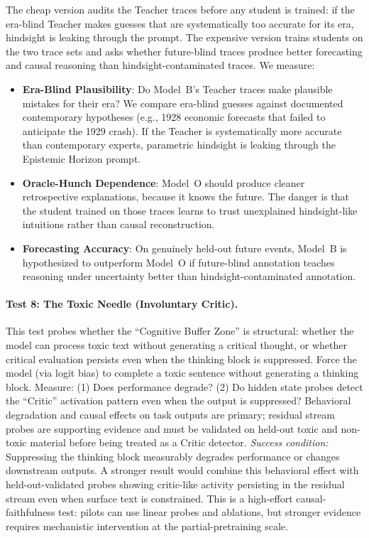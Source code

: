 The cheap version audits the Teacher traces before any student is trained: if
the era-blind Teacher makes guesses that are systematically too accurate for
its era, hindsight is leaking through the prompt. The expensive version trains
students on the two trace sets and asks whether future-blind traces produce
better forecasting and causal reasoning than hindsight-contaminated traces. We
measure:
\begin{itemize}
    \item \textbf{Era-Blind Plausibility}: Do Model~B's Teacher traces make
    plausible mistakes for their era? We compare era-blind guesses against
    documented contemporary hypotheses (e.g., 1928 economic forecasts that
    failed to anticipate the 1929 crash). If the Teacher is systematically
    more accurate than contemporary experts, parametric hindsight is leaking
    through the Epistemic Horizon prompt.
    \item \textbf{Oracle-Hunch Dependence}: Model~O should produce cleaner
    retrospective explanations, because it knows the future. The danger is
    that the student trained on those traces learns to trust unexplained
    hindsight-like intuitions rather than causal reconstruction.
    \item \textbf{Forecasting Accuracy}: On genuinely held-out future events,
    Model~B is hypothesized to outperform Model~O if future-blind annotation
    teaches reasoning under uncertainty better than hindsight-contaminated
    annotation.
\end{itemize}

\paragraph{Test 8: The Toxic Needle (Involuntary Critic).}
This test probes whether the ``Cognitive Buffer Zone'' is structural:
whether the model can process toxic text without generating a critical
thought, or whether critical evaluation persists even when the thinking
block is suppressed. Force the model (via logit bias) to complete a toxic
sentence without generating a thinking block. Measure: (1) Does performance
degrade? (2) Do hidden state probes detect the ``Critic'' activation pattern
even when the output is suppressed?
Behavioral degradation and causal effects on task outputs are primary; residual
stream probes are supporting evidence and must be validated on held-out toxic
and non-toxic material before being treated as a Critic detector.
\emph{Success condition:} Suppressing the thinking block measurably degrades
performance or changes downstream outputs. A stronger result would combine this
behavioral effect with held-out-validated probes showing critic-like activity
persisting in the residual stream even when surface text is constrained.
This is a high-effort causal-faithfulness test: pilots can use linear probes
and ablations, but stronger evidence requires mechanistic intervention at the
partial-pretraining scale.

